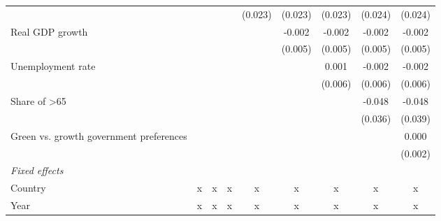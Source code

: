 \begin{table}[htbp]
\begin{tabular}{lcccccccc}
                                                                                      &         &         &                & (0.023)        & (0.023)        & (0.023)        & (0.024)        & (0.024)\\   
      Real GDP growth                                                                 &         &         &                &                & -0.002         & -0.002         & -0.002         & -0.002\\   
                                                                                      &         &         &                &                & (0.005)        & (0.005)        & (0.005)        & (0.005)\\   
      Unemployment rate                                                               &         &         &                &                &                & 0.001          & -0.002         & -0.002\\   
                                                                                      &         &         &                &                &                & (0.006)        & (0.006)        & (0.006)\\   
      Share of >65                                                                    &         &         &                &                &                &                & -0.048         & -0.048\\   
                                                                                      &         &         &                &                &                &                & (0.036)        & (0.039)\\   
      Green vs. growth government preferences                                         &         &         &                &                &                &                &                & 0.000\\   
                                                                                      &         &         &                &                &                &                &                & (0.002)\\   
      \emph{Fixed effects}\\
      Country                                                                         & x       & x       & x              & x              & x              & x              & x              & x\\  
      Year                                                                            & x       & x       & x              & x              & x              & x              & x              & x\\  

\end{tabular}
\end{table}
